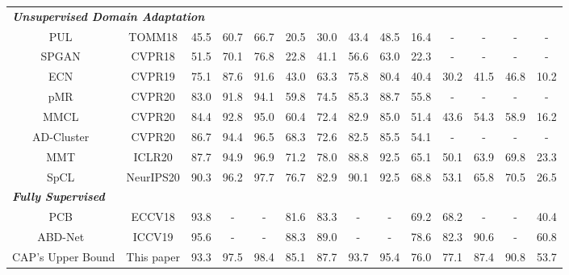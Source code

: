 \documentclass[letterpaper]{article} %
\begin{document}
\begin{table}[ht]
{\begin{tabular}{c|c|cccc|cccc|cccc}
\hline
\multicolumn{13}{l}{\textbf{\textit{Unsupervised Domain Adaptation}}} \\
PUL~\cite{unsup_clustering}  & TOMM18        & 45.5 &  60.7 &66.7 & 20.5         & 30.0 & 43.4 & 48.5 & 16.4           & - & - & - & - \\
SPGAN~\cite{deng2018similarity}  & CVPR18    & 51.5 & 70.1 & 76.8 & 22.8       & 41.1 & 56.6 & 63.0 & 22.3          & - & - & - & - \\
ECN~\cite{zhong2019invariance}    & CVPR19      & 75.1 & 87.6 & 91.6 & 43.0      & 63.3 & 75.8 & 80.4 & 40.4    & 30.2 & 41.5 & 46.8 & 10.2\\
pMR~\cite{Wang_2020_CVPR}         & CVPR20     & 83.0 & 91.8 & 94.1 & 59.8             & 74.5 & 85.3 & 88.7 & 55.8            & - & - & -  & -\\
MMCL~\cite{wang2020unsupervised} & CVPR20    & 84.4 & 92.8 & 95.0 & 60.4    & 72.4 & 82.9 & 85.0 & 51.4         & 43.6 & 54.3 & 58.9 & 16.2\\
AD-Cluster~\cite{zhai2020ad} & CVPR20 & 86.7 & 94.4 & 96.5 & 68.3 & 72.6 & 82.5 & 85.5 & 54.1 & - & - & - & - \\
MMT~\cite{ge2020mutual}   & ICLR20              &87.7 & 94.9 & 96.9 & 71.2       & 78.0 & 88.8 & 92.5 & 65.1     & 50.1 & 63.9 & 69.8 & 23.3\\
SpCL~\cite{ge2020self}        & NeurIPS20    & {\color{blue}90.3} & {\color{blue}96.2} & {\color{red}97.7} & {\color{blue}76.7}     & {\color{red}82.9} & {\color{red}90.1} & {\color{red}92.5} &{\color{red}68.8}      & {\color{blue}53.1} & {\color{blue}65.8} & {\color{blue}70.5} & 26.5\\
\hline
\multicolumn{13}{l}{\textbf{\textit{Fully Supervised}}} \\
PCB~\cite{sun2018beyond}   & ECCV18   & 93.8 &- &- & 81.6                  &83.3 &- &-   &69.2           &68.2 &- &- &40.4\\
ABD-Net~\cite{chen2019abd} & ICCV19 & 95.6 &- &- & 88.3 & 89.0 &- &- & 78.6 & 82.3 & 90.6 &- & 60.8 \\
CAP's Upper Bound       & This paper   & 93.3 & 97.5 & 98.4  & 85.1                 &87.7 & 93.7 & 95.4    &76.0         & 77.1 & 87.4 & 90.8  & 53.7 \\
\hline
\end{tabular}
}
\label{compare_SOTA_table}
\end{table}   %
\end{document}

